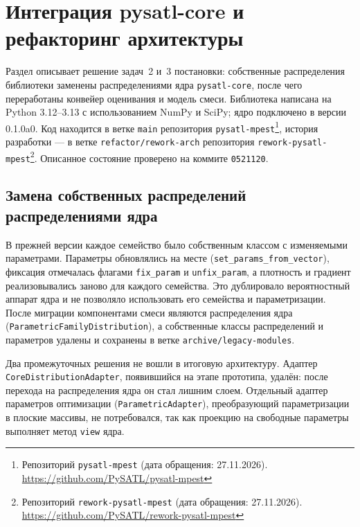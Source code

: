 
\section{Интеграция pysatl-core и рефакторинг архитектуры}
\label{sec:migration}

Раздел описывает решение задач~2 и~3 постановки: собственные распределения библиотеки заменены распределениями ядра \texttt{pysatl-core}, после чего переработаны конвейер оценивания и модель смеси. Библиотека написана на Python 3.12--3.13 с использованием NumPy и SciPy; ядро подключено в версии 0.1.0a0. Код находится в ветке \texttt{main} репозитория \texttt{pysatl-mpest}\footnote{Репозиторий \texttt{pysatl-mpest} (дата обращения: 27.11.2026). \url{https://github.com/PySATL/pysatl-mpest}}, история разработки --- в ветке \texttt{refactor/rework-arch} репозитория \texttt{rework-pysatl-mpest}\footnote{Репозиторий \texttt{rework-pysatl-mpest} (дата обращения: 27.11.2026). \url{https://github.com/PySATL/rework-pysatl-mpest}}. Описанное состояние проверено на коммите \texttt{0521120}.

\subsection{Замена собственных распределений распределениями ядра}
\label{sec:migration-core}

В прежней версии каждое семейство было собственным классом с изменяемыми параметрами. Параметры обновлялись на месте (\texttt{set\_params\_from\_vector}), фиксация отмечалась флагами \texttt{fix\_param} и \texttt{unfix\_param}, а плотность и градиент реализовывались заново для каждого семейства. Это дублировало вероятностный аппарат ядра и не позволяло использовать его семейства и параметризации. После миграции компонентами смеси являются распределения ядра (\texttt{ParametricFamilyDistribution}), а собственные классы распределений и параметров удалены и сохранены в ветке \texttt{archive/legacy-modules}.

Два промежуточных решения не вошли в итоговую архитектуру. Адаптер \texttt{CoreDistributionAdapter}, появившийся на этапе прототипа, удалён: после перехода на распределения ядра он стал лишним слоем. Отдельный адаптер параметров оптимизации (\texttt{ParametricAdapter}), преобразующий параметризации в плоские массивы, не потребовался, так как проекцию на свободные параметры выполняет метод \texttt{view} ядра.

